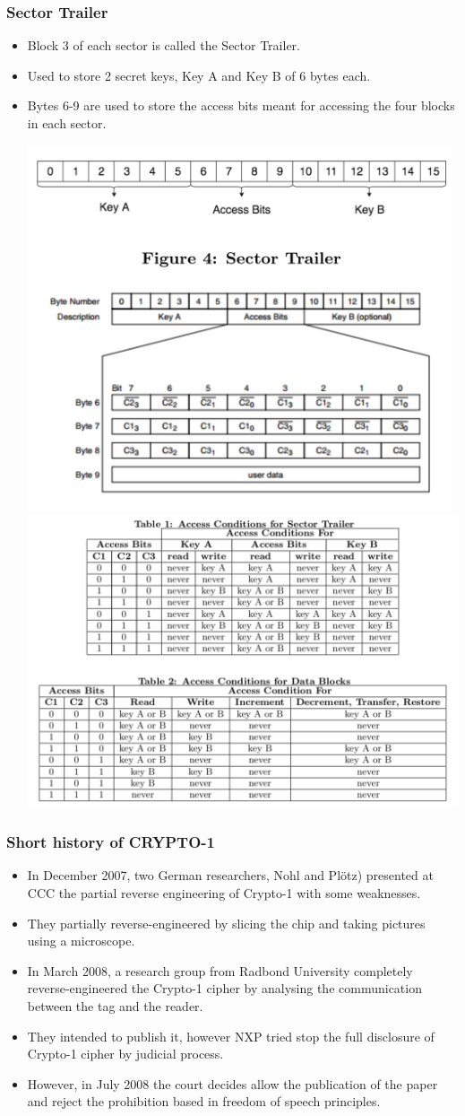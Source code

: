 \documentclass[12pt]{beamer}
\begin{document}
\begin{frame}
\frametitle{Sector Trailer}
\begin{itemize}
	\item Block 3 of each sector is called the Sector Trailer.
	\item Used to store 2 secret keys, Key A and Key B of 6 bytes each.
	\item Bytes 6-9 are used to store the access bits meant for accessing the four blocks in each sector.
	\begin{center}
		\includegraphics[width=0.45\linewidth]{sector-trailer}\includegraphics[width=0.55\linewidth]{access-condition}
	\end{center}
\end{itemize}
\end{frame}

\begin{frame}
\frametitle{Short history of CRYPTO-1}
\begin{itemize}
	\item In December 2007, two German researchers, Nohl and Pl{\"o}tz) presented at CCC the partial reverse engineering of Crypto-1 with some weaknesses.
	\item They partially reverse-engineered by slicing the chip and taking pictures using a microscope.
	\item In March 2008, a research group from Radbond University completely reverse-engineered the Crypto-1 cipher by analysing the communication between the tag and the reader.
	\item They intended to publish it, however NXP tried stop the full disclosure of Crypto-1 cipher by judicial process.
	\item However, in July 2008 the court decides allow the publication of the paper and reject the prohibition based in freedom of speech principles.
\end{itemize}
\end{frame}
\end{document}
